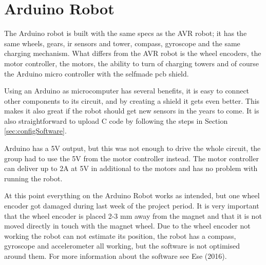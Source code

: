 \section{Arduino Robot}
The Arduino robot is built with the same specs as the AVR robot; it has the same wheels, gears, \acrshort{ir} sensors and tower, compass, gyroscope and the same charging mechanism. What differs from the AVR robot is the wheel encoders, the motor controller, the motors, the ability to turn of charging towers and of course the Arduino micro controller with the selfmade \acrshort{pcb} shield. 

Using an Arduino as microcomputer has several benefits, it is easy to connect other components to its circuit, and by creating a shield it gets even better. This makes it also great if the robot should get new sensors in the years to come. It is also straightforward to upload C code by following the steps in Section \ref{sec:configSoftware}. 

Arduino has a 5V output, but this was not enough to drive the whole circuit, the group had to use the 5V from the motor controller instead. The motor controller can deliver up to 2A at 5V in additional to the motors and has no problem with running the robot.

At this point everything on the Arduino Robot works as intended, but one wheel encoder got damaged during last week of the project period. It is very important that the wheel encoder is placed 2-3 mm away from the magnet and that it is not moved directly in touch with the magnet wheel. Due to the wheel encoder not working the robot can not estimate its position, the robot has a compass, gyroscope and accelerometer all working, but the software is not optimised around them. For more information about the software see Ese (2016).
